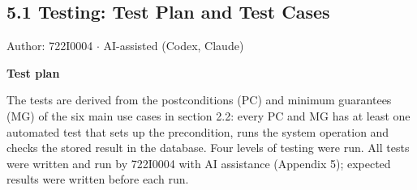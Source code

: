\subsection*{5.1 Testing: Test Plan and Test Cases}
Author: 722I0004 \ensuremath{\cdot} AI-assisted (Codex, Claude)

\textbf{Test plan}

The tests are derived from the postconditions (PC) and minimum guarantees (MG) of the six main use cases in section 2.2: every PC and MG has at least one automated test that sets up the precondition, runs the system operation and checks the stored result in the database. Four levels of testing were run. All tests were written and run by 722I0004 with AI assistance (Appendix 5); expected results were written before each run.


